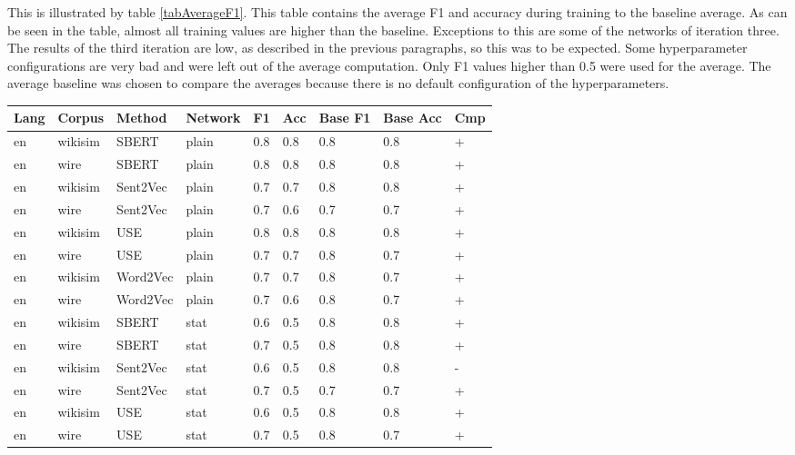 {This is illustrated by table \ref{tabAverageF1}. This table contains the average F1 and accuracy during training to the baseline average. As can be seen in the table, almost all training values are higher than the baseline. Exceptions to this are some of the networks of iteration three. The results of the third iteration are low, as described in the previous paragraphs, so this was to be expected. Some hyperparameter configurations are very bad and were left out of the average computation. Only F1 values higher than 0.5 were used for the average. The average baseline was chosen to compare the averages because there is no default configuration of the hyperparameters.\\

  \begin{table}[!ht]
    \centering
    \captionsetup{justification=centering}
    \begin{tabular}{l|l|l|l|l|l|l|l|l}
    \hline
        \textbf{Lang} & \textbf{Corpus} & \textbf{Method} & \textbf{Network} & \textbf{F1} & \textbf{Acc} & \textbf{Base F1} & \textbf{Base Acc} & \textbf{Cmp} \\ \hline
en & wikisim & SBERT & plain & 0.8 & 0.8 & 0.8 & 0.8 & + \\ \hline
en & wire & SBERT & plain & 0.8 & 0.8 & 0.8 & 0.8 & + \\ \hline
en & wikisim & Sent2Vec & plain & 0.7 & 0.7 & 0.8 & 0.8 & + \\ \hline
en & wire & Sent2Vec & plain & 0.7 & 0.6 & 0.7 & 0.7 & + \\ \hline
en & wikisim & USE & plain & 0.8 & 0.8 & 0.8 & 0.8 & + \\ \hline
en & wire & USE & plain & 0.7 & 0.7 & 0.8 & 0.7 & + \\ \hline
en & wikisim & Word2Vec & plain & 0.7 & 0.7 & 0.8 & 0.7 & + \\ \hline
en & wire & Word2Vec & plain & 0.7 & 0.6 & 0.8 & 0.7 & + \\ \hline
en & wikisim & SBERT & stat & 0.6 & 0.5 & 0.8 & 0.8 & + \\ \hline
en & wire & SBERT & stat & 0.7 & 0.5 & 0.8 & 0.8 & + \\ \hline
en & wikisim & Sent2Vec & stat & 0.6 & 0.5 & 0.8 & 0.8 & - \\ \hline
en & wire & Sent2Vec & stat & 0.7 & 0.5 & 0.7 & 0.7 & + \\ \hline
en & wikisim & USE & stat & 0.6 & 0.5 & 0.8 & 0.8 & + \\ \hline
en & wire & USE & stat & 0.7 & 0.5 & 0.8 & 0.7 & + \\ \hline

\end{tabular}
\end{table}}
